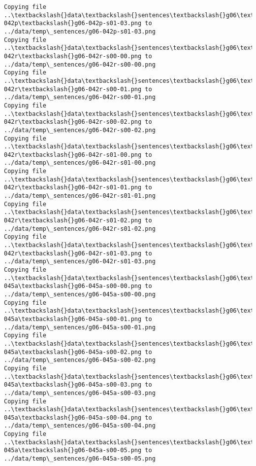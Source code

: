 \documentclass[11pt]{article}
\begin{document}
\begin{Verbatim}[commandchars=\\\{\}]
Copying file ..\textbackslash{}data\textbackslash{}sentences\textbackslash{}g06\textbackslash{}g06-042p\textbackslash{}g06-042p-s01-03.png to
../data/temp\_sentences/g06-042p-s01-03.png
Copying file ..\textbackslash{}data\textbackslash{}sentences\textbackslash{}g06\textbackslash{}g06-042r\textbackslash{}g06-042r-s00-00.png to
../data/temp\_sentences/g06-042r-s00-00.png
Copying file ..\textbackslash{}data\textbackslash{}sentences\textbackslash{}g06\textbackslash{}g06-042r\textbackslash{}g06-042r-s00-01.png to
../data/temp\_sentences/g06-042r-s00-01.png
Copying file ..\textbackslash{}data\textbackslash{}sentences\textbackslash{}g06\textbackslash{}g06-042r\textbackslash{}g06-042r-s00-02.png to
../data/temp\_sentences/g06-042r-s00-02.png
Copying file ..\textbackslash{}data\textbackslash{}sentences\textbackslash{}g06\textbackslash{}g06-042r\textbackslash{}g06-042r-s01-00.png to
../data/temp\_sentences/g06-042r-s01-00.png
Copying file ..\textbackslash{}data\textbackslash{}sentences\textbackslash{}g06\textbackslash{}g06-042r\textbackslash{}g06-042r-s01-01.png to
../data/temp\_sentences/g06-042r-s01-01.png
Copying file ..\textbackslash{}data\textbackslash{}sentences\textbackslash{}g06\textbackslash{}g06-042r\textbackslash{}g06-042r-s01-02.png to
../data/temp\_sentences/g06-042r-s01-02.png
Copying file ..\textbackslash{}data\textbackslash{}sentences\textbackslash{}g06\textbackslash{}g06-042r\textbackslash{}g06-042r-s01-03.png to
../data/temp\_sentences/g06-042r-s01-03.png
Copying file ..\textbackslash{}data\textbackslash{}sentences\textbackslash{}g06\textbackslash{}g06-045a\textbackslash{}g06-045a-s00-00.png to
../data/temp\_sentences/g06-045a-s00-00.png
Copying file ..\textbackslash{}data\textbackslash{}sentences\textbackslash{}g06\textbackslash{}g06-045a\textbackslash{}g06-045a-s00-01.png to
../data/temp\_sentences/g06-045a-s00-01.png
Copying file ..\textbackslash{}data\textbackslash{}sentences\textbackslash{}g06\textbackslash{}g06-045a\textbackslash{}g06-045a-s00-02.png to
../data/temp\_sentences/g06-045a-s00-02.png
Copying file ..\textbackslash{}data\textbackslash{}sentences\textbackslash{}g06\textbackslash{}g06-045a\textbackslash{}g06-045a-s00-03.png to
../data/temp\_sentences/g06-045a-s00-03.png
Copying file ..\textbackslash{}data\textbackslash{}sentences\textbackslash{}g06\textbackslash{}g06-045a\textbackslash{}g06-045a-s00-04.png to
../data/temp\_sentences/g06-045a-s00-04.png
Copying file ..\textbackslash{}data\textbackslash{}sentences\textbackslash{}g06\textbackslash{}g06-045a\textbackslash{}g06-045a-s00-05.png to
../data/temp\_sentences/g06-045a-s00-05.png

\end{Verbatim}
\end{document}
